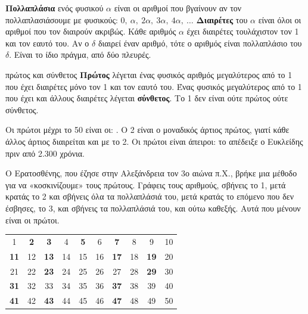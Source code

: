 

\textbf{Πολλαπλάσια} ενός φυσικού $\alpha$ είναι οι αριθμοί που βγαίνουν αν τον πολλαπλασιάσουμε με φυσικούς: $0,\ \alpha,\ 2\alpha,\ 3\alpha,\ 4\alpha,\ \dots$ \textbf{Διαιρέτες} του $\alpha$ είναι όλοι οι αριθμοί που τον διαιρούν ακριβώς. Κάθε αριθμός $\alpha$ έχει διαιρέτες τουλάχιστον τον 1 και τον εαυτό του. Αν ο $\delta$ διαιρεί έναν αριθμό, τότε ο αριθμός είναι πολλαπλάσιο του $\delta$. Είναι το ίδιο πράγμα, από δύο πλευρές.

\begin{orismos}{πρώτος και σύνθετος}
\textbf{Πρώτος} λέγεται ένας φυσικός αριθμός μεγαλύτερος από το 1 που έχει διαιρέτες μόνο τον 1 και τον εαυτό του. Ένας φυσικός μεγαλύτερος από το 1 που έχει και άλλους διαιρέτες λέγεται \textbf{σύνθετος}. Το 1 δεν είναι ούτε πρώτος ούτε σύνθετος.
\end{orismos}

Οι πρώτοι μέχρι το 50 είναι οι: . Ο 2 είναι ο μοναδικός άρτιος πρώτος, γιατί κάθε άλλος άρτιος διαιρείται και με το 2. Οι πρώτοι είναι άπειροι: το απέδειξε ο Ευκλείδης πριν από 2.300 χρόνια.


Ο Ερατοσθένης, που έζησε στην Αλεξάνδρεια τον 3ο αιώνα π.Χ., βρήκε μια μέθοδο για να «κοσκινίζουμε» τους πρώτους. Γράφεις τους αριθμούς, σβήνεις το 1, μετά κρατάς το 2 και σβήνεις όλα τα πολλαπλάσιά του, μετά κρατάς το επόμενο που δεν έσβησες, το 3, και σβήνεις τα πολλαπλάσιά του, και ούτω καθεξής. Αυτά που μένουν είναι οι πρώτοι.

\begin{center}
\renewcommand{\arraystretch}{1.25}
\setlength{\tabcolsep}{5pt}
\newcommand{\pr}[1]{\textcolor{gblue}{\bfseries #1}}
\begin{tabular}{cccccccccc}
1 & \pr{2} & \pr{3} & 4 & \pr{5} & 6 & \pr{7} & 8 & 9 & 10\\
\pr{11} & 12 & \pr{13} & 14 & 15 & 16 & \pr{17} & 18 & \pr{19} & 20\\
21 & 22 & \pr{23} & 24 & 25 & 26 & 27 & 28 & \pr{29} & 30\\
\pr{31} & 32 & 33 & 34 & 35 & 36 & \pr{37} & 38 & 39 & 40\\
\pr{41} & 42 & \pr{43} & 44 & 45 & 46 & \pr{47} & 48 & 49 & 50\\
\end{tabular}
\end{center}

